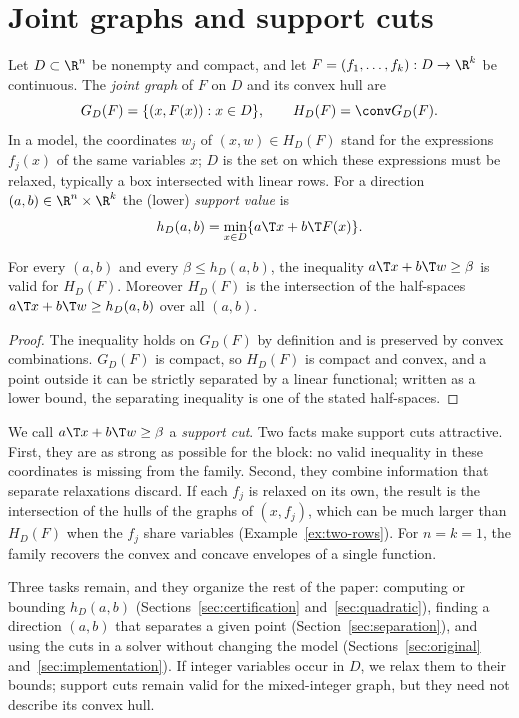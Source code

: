 \section{Joint graphs and support cuts}\label{sec:setting}

Let $D\subset\R^n$ be nonempty and compact, and let
$F=(f_1,\dots,f_k):D\to\R^k$ be continuous. The \emph{joint graph} of $F$
on $D$ and its convex hull are
\begin{equation}\label{eq:joint-hull}
G_D(F)=\{(x,F(x)):x\in D\},\qquad H_D(F)=\conv G_D(F).
\end{equation}
In a model, the coordinates $w_j$ of $(x,w)\in H_D(F)$ stand for the
expressions $f_j(x)$ of the same variables $x$; $D$ is the set on which
these expressions must be relaxed, typically a box intersected with
linear rows. For a direction $(a,b)\in\R^n\times\R^k$ the (lower)
\emph{support value} is
\begin{equation}\label{eq:support}
h_D(a,b)=\min_{x\in D}\{a\T x+b\T F(x)\}.
\end{equation}

\begin{proposition}\label{prop:support}
For every $(a,b)$ and every $\beta\le h_D(a,b)$, the inequality
$a\T x+b\T w\ge\beta$ is valid for $H_D(F)$. Moreover $H_D(F)$ is the
intersection of the half-spaces $a\T x+b\T w\ge h_D(a,b)$ over all
$(a,b)$.
\end{proposition}

\begin{proof}
The inequality holds on $G_D(F)$ by definition and is preserved by
convex combinations. $G_D(F)$ is compact, so $H_D(F)$ is compact and
convex, and a point outside it can be strictly separated by a linear
functional; written as a lower bound, the separating inequality is one
of the stated half-spaces.
\end{proof}

We call $a\T x+b\T w\ge\beta$ a \emph{support cut}. Two facts make
support cuts attractive. First, they are as strong as possible for the
block: no valid inequality in these coordinates is missing from the
family. Second, they combine information that separate relaxations
discard. If each $f_j$ is relaxed on its own, the result is the
intersection of the hulls of the graphs of $(x,f_j)$, which can be much
larger than $H_D(F)$ when the $f_j$ share variables
(Example~\ref{ex:two-rows}). For $n=k=1$, the family recovers the convex
and concave envelopes of a single function.

Three tasks remain, and they organize the rest of the paper: computing or
bounding $h_D(a,b)$ (Sections~\ref{sec:certification}
and~\ref{sec:quadratic}), finding a direction $(a,b)$ that separates a
given point (Section~\ref{sec:separation}), and using the cuts in a
solver without changing the model (Sections~\ref{sec:original}
and~\ref{sec:implementation}). If integer variables occur in $D$, we
relax them to their bounds; support cuts remain valid for the mixed-integer
graph, but they need not describe its convex hull.


